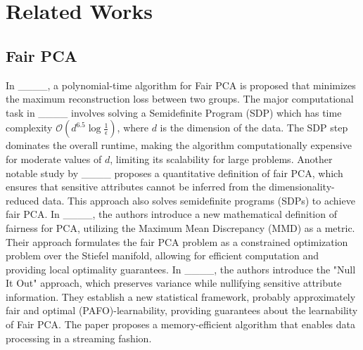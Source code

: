 \section{Related Works}
\subsection{Fair PCA}
In ____, a polynomial-time algorithm for Fair PCA is proposed that minimizes the maximum reconstruction loss between two groups. %
The major computational task in ____ involves solving a Semidefinite Program (SDP) which has time complexity \( \mathcal{O}(d^{6.5} \log\frac{1}{\epsilon}) \), where $d$ is the dimension of the data. %
The SDP step dominates the overall runtime, making the algorithm computationally expensive for moderate values of \( d \), limiting its scalability for large problems. %
Another notable study by ____ proposes a quantitative definition of fair PCA, which ensures that sensitive attributes cannot be inferred from the dimensionality-reduced data. %
This approach also solves semidefinite programs (SDPs) to achieve fair PCA.%
In ____, the authors introduce a new mathematical definition of fairness for PCA, utilizing the Maximum Mean Discrepancy (MMD) as a metric. %
Their approach formulates the fair PCA problem as a constrained optimization problem over the Stiefel manifold, allowing for efficient computation and providing local optimality guarantees. %
In ____, the authors introduce the "Null It Out" approach, which preserves variance while nullifying sensitive attribute information. They establish a new statistical framework, probably approximately fair and optimal (PAFO)-learnability, providing guarantees about the learnability of Fair PCA. The paper proposes a memory-efficient algorithm that enables data processing in a streaming fashion. %

